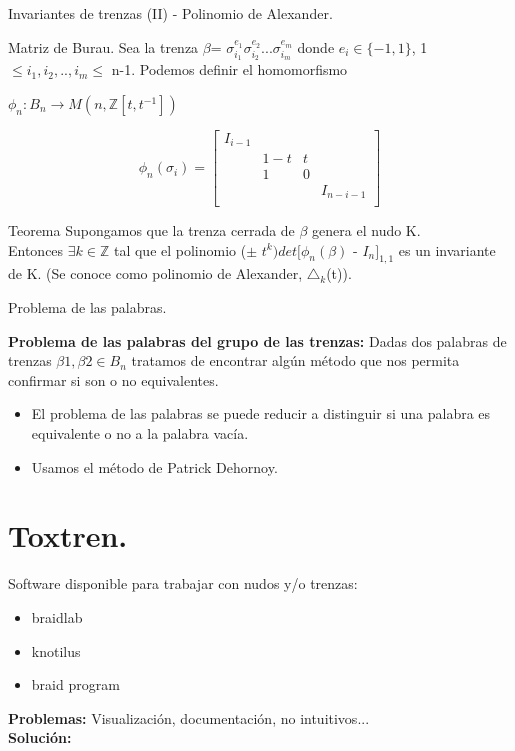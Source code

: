 \documentclass{beamer}
\let\emph\relax
\newcommand{\emph}{\alert}
\begin{document}
\begin{frame}{Invariantes de trenzas (II) - Polinomio de Alexander.}
	\begin{block}{Matriz de Burau.}
		Sea la trenza $\beta $= $\sigma_{i_{1}}^{e_{1}} \sigma_{i_{2}}^{e_{2}} ... \sigma_{i_{m}}^{e_{m}}$ donde $e_{i} \in \{-1,1\}$, 1 $\le i_{1}, i_{2},..,i_{m} \le$ n-1. Podemos definir el homomorfismo
		\begin{center}
			$ \phi_{n} : B_{n}  \rightarrow  M(n,\mathds{Z}[t,t^{-1}])$	 
		\end{center}
		\[ \phi_{n} ( \sigma_{i}) = \begin{bmatrix}
		I_{i-1} &  &  & \\
		& 1-t & t &  \\
		& 1 & 0 &  \\
		&  &  & I_{n-i-1} \\
		\end{bmatrix}\]
	\end{block}
	\begin{alertblock}{Teorema}
		Supongamos que la trenza cerrada de $\beta$ genera el nudo K.\\
		Entonces $\exists k \in \mathds{Z}$ tal que el polinomio ($ \pm $ $ t^{k} )det[\phi_{n}(\beta)$ - $ I_{n} $$ ]_{1,1} $ es un invariante de K. (Se conoce como polinomio de Alexander, $ \triangle_{k} $(t)).
	\end{alertblock}
\end{frame}

\begin{frame}{Problema de las palabras.}
	\begin{block}{\textbf{Problema de las palabras del grupo de las trenzas:}}
		Dadas dos palabras de trenzas $\beta1, \beta2 \in B_{n}$ tratamos de encontrar algún método que nos permita confirmar si son o no equivalentes. \\
	\end{block}
	\begin{itemize}
		\item El problema de las palabras se puede reducir a distinguir si una palabra es equivalente o no a la palabra vacía.
		\item Usamos el método de Patrick Dehornoy. 
	\end{itemize}
	
\end{frame}

\section{Toxtren.}
\begin{frame}
	Software disponible para trabajar con nudos y/o trenzas:
	\begin{itemize}
		\item braidlab
		\item knotilus
		\item braid program
	\end{itemize}
	\textbf{Problemas: } Visualización, documentación, no intuitivos...\\
	\textbf{Solución: }\emph{Toxtren.}
\end{frame}
\end{document}
